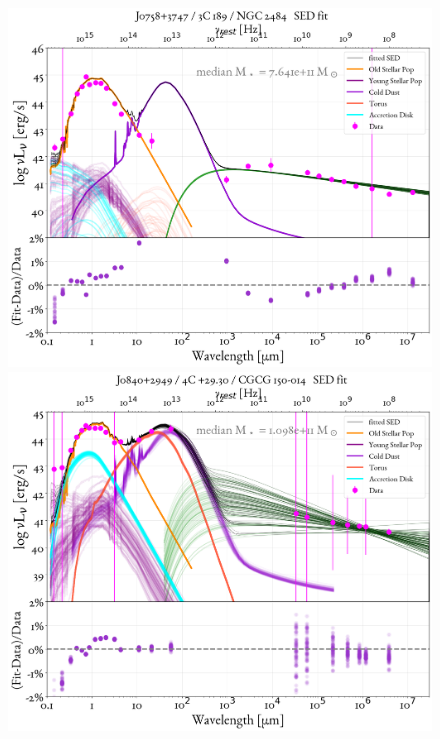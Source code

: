 \begin{figure}
    \centering
    \includegraphics[width=0.85\linewidth]{figures/ResultFits/25_SEDfit_1971.png}\\
    \includegraphics[width=0.85\linewidth]{figures/ResultFits/28_SEDfit_2029.png}    
\end{figure}
